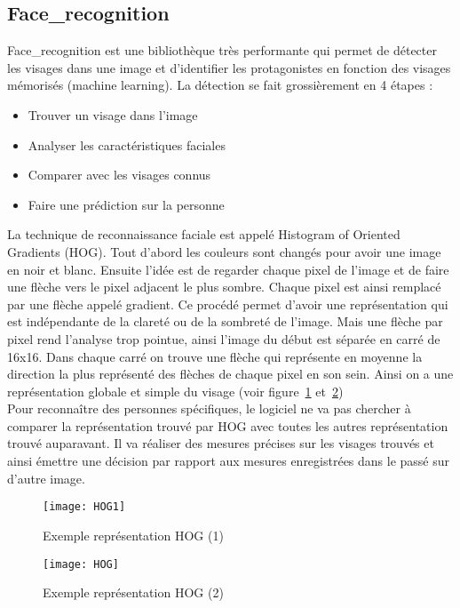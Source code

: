 \subsection{Face\_recognition}
Face\_recognition est une bibliothèque très performante qui permet de détecter
les visages dans une image et d'identifier les protagonistes en fonction des
visages mémorisés (machine learning). La détection se fait grossièrement en
4 étapes :
\begin{itemize}
  \item{Trouver un visage dans l'image}
  \item{Analyser les caractéristiques faciales}
  \item{Comparer avec les visages connus}
  \item{Faire une prédiction sur la personne}
\end{itemize}
\vspace{0.5cm}
La technique de reconnaissance faciale est appelé Histogram of Oriented Gradients
(HOG). Tout d'abord les couleurs sont changés pour avoir une image en noir et blanc.
Ensuite l'idée est de regarder chaque pixel de l'image et de faire une flèche vers
le pixel adjacent le plus sombre. Chaque pixel est ainsi remplacé par une flèche
appelé gradient. Ce procédé permet d'avoir une représentation qui est indépendante
de la clareté ou de la sombreté de l'image. Mais une flèche par pixel rend
l'analyse trop pointue, ainsi l'image du début est séparée en carré de 16x16.
Dans chaque carré on trouve une flèche qui représente en moyenne la direction
la plus représenté des flèches de chaque pixel en son sein. Ainsi on a une
représentation globale et simple du visage (voir figure~\ref{fig:HOG} et~\ref{fig:HOG1})
\\
Pour reconnaître des personnes spécifiques, le logiciel ne va pas chercher à
comparer la représentation trouvé par HOG avec toutes les autres représentation
trouvé auparavant. Il va réaliser des mesures précises sur les visages trouvés
et ainsi émettre une décision par rapport aux mesures enregistrées dans le passé
sur d'autre image.
\\
\newpage
\begin{figure}[h]
  \begin{center}
  \texttt{[image: HOG1]}
  \caption{Exemple représentation HOG (1)}
  \label{fig:HOG}
\end{center}
\end{figure}

\begin{figure}[h]
  \begin{center}
  \texttt{[image: HOG]}
  \caption{Exemple représentation HOG (2)}
  \label{fig:HOG1}
\end{center}
\end{figure}
\newpage
